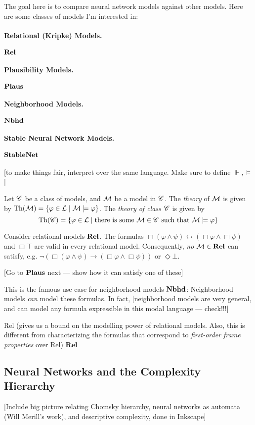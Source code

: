 \documentclass[letterpaper]{article}
\begin{document}
The goal here is to compare neural network models against other models.  Here are some classes of models I'm interested in:

\paragraph*{Relational (Kripke) Models.} $\textrm{\textbf{Rel}}$

\paragraph*{Plausibility Models.} $\textrm{\textbf{Plaus}}$

\paragraph*{Neighborhood Models.} $\textrm{\textbf{Nbhd}}$

\paragraph*{Stable Neural Network Models.} $\textrm{\textbf{StableNet}}$

\paragraph*{}

[to make things fair, interpret over the same language.  Make sure to define $\Vdash, \models$]

\begin{definition}
    Let $\mathscr{C}$ be a class of models, and $\mathcal{M}$ be a model in $\mathscr{C}$.  The \emph{theory} of $\mathcal{M}$ is given by $\mathrm{Th}( \mathcal{M} ) = \{ \varphi \in \mathcal{L} \mid \mathcal{M} \models \varphi \}$.  The \emph{theory of class $\mathscr{C}$} is given by 
    \[
        \mathrm{Th}( \mathscr{C} ) = \{ \varphi \in \mathcal{L} \mid \textrm{there is some } \mathcal{M} \in \mathscr{C} \textrm{ such that } \mathcal{M} \models \varphi \}
    \]
\end{definition}

\begin{example}
    Consider relational models $\textrm{\textbf{Rel}}$.  The formulas $\Box(\varphi \land \psi) \leftrightarrow (\Box \varphi \land \Box \psi)$ and $\Box \top$ are valid in every relational model.  Consequently, \emph{no} $\mathcal{M} \in \textrm{\textbf{Rel}}$ can satisfy, e.g. $\neg (\Box(\varphi \land \psi) \to (\Box \varphi \land \Box \psi))$ or $\Diamond \bot$.

    [Go to $\textrm{\textbf{Plaus}}$ next --- show how it can satisfy one of these]

    This is the famous use case for neighborhood models $\textrm{\textbf{Nbhd}}$: Neighborhood models \emph{can} model these formulas.  In fact, [neighborhood models are very general, and can model any formula expressible in this modal language --- check!!!]
    
    Rel (gives us a bound on the modelling power of relational models.  Also, this is different from characterizing the formulas that correspond to \emph{first-order frame properties} over Rel)
    $\textbf{Rel}$
\end{example}

\subsection*{Neural Networks and the Complexity Hierarchy}

[Include big picture relating Chomsky hierarchy, neural networks as automata (Will Merill's work), and descriptive complexity, done in Inkscape]

\printbibliography
\end{document}
